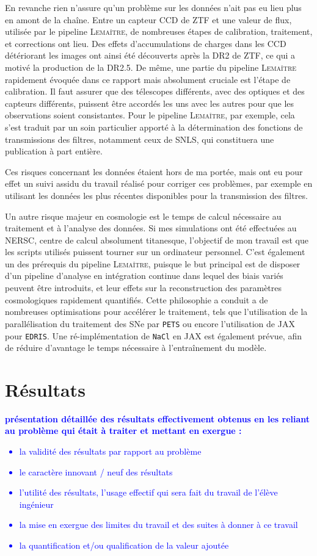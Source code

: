 \documentclass{book}
\newcommand{\consignes}[1]{{\textcolor{blue}{\bf \large #1}}}
\def\lemaitre{\textsc{Lemaître}\xspace}
\def\pets{\texttt{PETS}\xspace}
\def\nacl{\texttt{NaCl}\xspace}
\def\edris{\texttt{EDRIS}\xspace}
\begin{document}
En revanche rien n'assure qu'un problème sur les données n'ait pas eu lieu plus en amont de la chaîne. Entre un capteur CCD de ZTF et une valeur de flux, utilisée par le pipeline \lemaitre, de nombreuses étapes de calibration, traitement, et corrections ont lieu. Des effets d'accumulations de charges dans les CCD détériorant les images ont ainsi été découverts après la DR2 de ZTF, ce qui a motivé la production de la DR2.5. De même, une partie du pipeline \lemaitre rapidement évoquée dans ce rapport mais absolument cruciale est l'étape de calibration. Il faut assurer que des télescopes différents, avec des optiques et des capteurs différents, puissent être accordés les uns avec les autres pour que les observations soient consistantes. Pour le pipeline \lemaitre, par exemple, cela s'est traduit par un soin particulier apporté à la détermination des fonctions de transmissions des filtres, notamment ceux de SNLS, qui constituera une publication à part entière.

Ces risques concernant les données étaient hors de ma portée, mais ont eu pour effet un suivi assidu du travail réalisé pour corriger ces problèmes, par exemple en utilisant les données les plus récentes disponibles pour la transmission des filtres.


Un autre risque majeur en cosmologie est le temps de calcul nécessaire au traitement et à l'analyse des données. Si mes simulations ont été effectuées au NERSC, centre de calcul absolument titanesque, l'objectif de mon travail est que les scripts utilisés puissent tourner sur un ordinateur personnel. C'est également un des prérequis du pipeline \lemaitre, puisque le but principal est de disposer d'un pipeline d'analyse en intégration continue dans lequel des biais variés peuvent être introduits, et leur effets sur la reconstruction des paramètres cosmologiques rapidement quantifiés. Cette philosophie a conduit a de nombreuses optimisations pour accélérer le traitement, tels que l'utilisation de la parallélisation du traitement des SNe par \pets ou encore l'utilisation de JAX pour \edris. Une ré-implémentation de \nacl en JAX est également prévue, afin de réduire d'avantage le temps nécessaire à l'entraînement du modèle.


\chapter{Résultats}
\consignes{présentation détaillée des résultats effectivement obtenus en les reliant au problème qui était à traiter et mettant en exergue :
\begin{itemize}
\item la validité des résultats par rapport au problème
\item le caractère innovant / neuf des résultats
\item l’utilité des résultats, l’usage effectif qui sera fait du travail de l’élève ingénieur
\item la mise en exergue des limites du travail et des suites à donner à ce travail
\item la quantification et/ou qualification de la valeur ajoutée
\end{itemize}}
\end{document}
